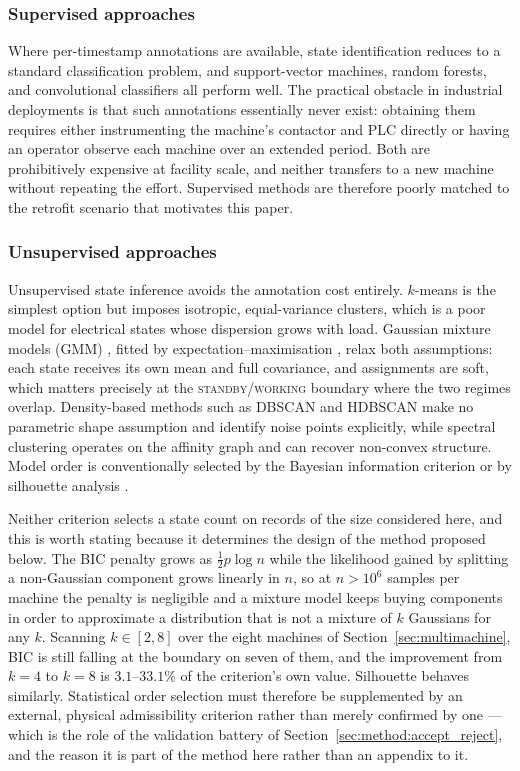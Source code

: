 \subsubsection{Supervised approaches}
Where per-timestamp annotations are available, state identification
reduces to a standard classification problem, and support-vector
machines, random forests, and convolutional classifiers all perform
well. The practical obstacle in industrial deployments is that such
annotations essentially never exist: obtaining them requires either
instrumenting the machine's contactor and PLC directly or having an
operator observe each machine over an extended period. Both are
prohibitively expensive at facility scale, and neither transfers to a
new machine without repeating the effort. Supervised methods are
therefore poorly matched to the retrofit scenario that motivates this
paper.

\subsubsection{Unsupervised approaches}
Unsupervised state inference avoids the annotation cost entirely.
$k$-means \cite{lloyd1982least} is the simplest option but imposes
isotropic, equal-variance clusters, which is a poor model for
electrical states whose dispersion grows with load. Gaussian mixture
models (GMM) \cite{mclachlan2000finite}, fitted by
expectation--maximisation \cite{dempster1977em}, relax both assumptions:
each state receives its own mean and full covariance, and assignments
are soft, which matters precisely at the \textsc{standby}/\textsc{working}
boundary where the two regimes overlap. Density-based methods such as
DBSCAN \cite{ester1996dbscan} and HDBSCAN \cite{campello2015hdbscan}
make no parametric shape assumption and identify noise points
explicitly, while spectral clustering \cite{ng2001spectral} operates on
the affinity graph and can recover non-convex structure. Model order is
conventionally selected by the Bayesian information criterion
\cite{schwarz1978bic} or by silhouette analysis
\cite{rousseeuw1987silhouettes}.

Neither criterion selects a state count on records of the size
considered here, and this is worth stating because it determines the
design of the method proposed below. The BIC penalty grows as
$\tfrac{1}{2}p\log n$ while the likelihood gained by splitting a
non-Gaussian component grows linearly in $n$, so at $n>10^{6}$ samples
per machine the penalty is negligible and a mixture model keeps buying
components in order to approximate a distribution that is not a mixture
of $k$ Gaussians for any $k$. Scanning $k\in[2,8]$ over the eight
machines of Section~\ref{sec:multimachine}, BIC is still falling at the
boundary on seven of them, and the improvement from $k=4$ to $k=8$ is
$3.1$--$33.1\%$ of the criterion's own value. Silhouette behaves
similarly. Statistical order selection must therefore be supplemented
by an external, physical admissibility criterion rather than merely
confirmed by one --- which is the role of the validation battery of
Section~\ref{sec:method:accept_reject}, and the reason it is part of
the method here rather than an appendix to it.

